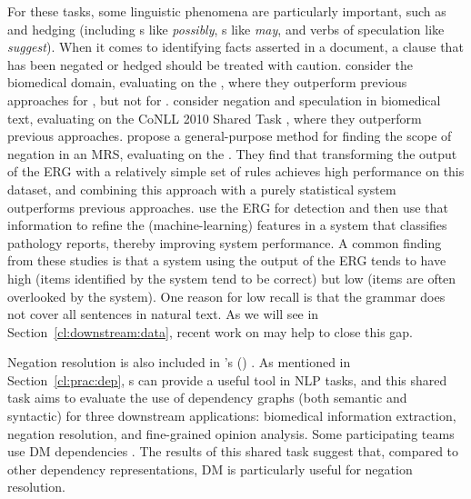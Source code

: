 \documentclass[output=paper
                ,modfonts
                ,nonflat
	        ,collection
	        ,collectionchapter
	        ,collectiontoclongg
 	        ,biblatex
                ,babelshorthands
                ,newtxmath
                ,draftmode
                ,colorlinks, citecolor=brown
]{./langsci/langscibook}
\begin{document}
For these tasks, some linguistic phenomena are particularly important,
such as  and hedging
(including s like \textit{possibly}, s like \textit{may}, and verbs of speculation like \textit{suggest}).
When it comes to identifying facts asserted in a document,
a clause that has been negated or hedged should be treated with caution.
\citet{mackinlay2012biomed} consider the biomedical domain,
evaluating on the  \citep{kim2009task},
where they outperform previous approaches for , but not for .
\citet{velldal2012specneg} consider negation and speculation in biomedical text,
evaluating on the CoNLL 2010 Shared Task \citep{farkas2010task},
where they outperform previous approaches.
\citet{packard2014neg} propose a general-purpose method for finding the scope of negation in an MRS,
evaluating on the  \citep{morante2012task}.
They find that transforming the output of the ERG
with a relatively simple set of rules
achieves high performance on this  dataset,
and combining this approach with a purely statistical system
outperforms previous approaches.
\citet{zamaraeva2018pathology} use the ERG for  detection and then
use that information to refine the (machine-learning) features in a 
system that classifies  pathology reports,
thereby improving system performance.
A common finding from these studies
is that a system using the output of the ERG
tends to have high  (items identified by the system tend to be correct)
but low  (items are often overlooked by the system).
One reason for low recall is that the grammar does not cover all sentences in natural text.
As we will see in Section~\ref{cl:downstream:data},
recent work on  may help to close this  gap.

Negation resolution is also included in \citeauthor{oepen2017extrinsic}'s (\citeyear{oepen2017extrinsic})
.
As mentioned in Section~\ref{cl:prac:dep},
s can provide a useful tool in NLP tasks,
and this shared task aims to evaluate the use of dependency graphs
(both semantic and syntactic)
for three downstream applications:
biomedical information extraction, negation resolution, and fine-grained opinion analysis.
Some participating teams use DM dependencies%
\citep{schuster2017dep,chen2017dep}.
The results of this shared task suggest that,
compared to other dependency representations,
DM is particularly useful for negation resolution.
\end{document}
